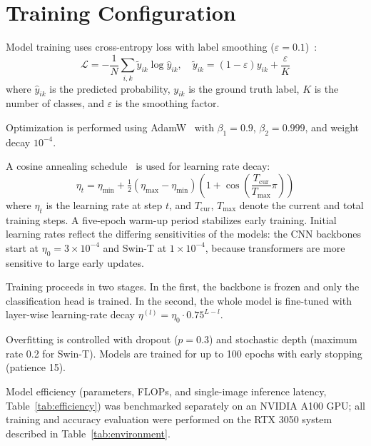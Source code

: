 \documentclass[runningheads]{llncs}
\begin{document}
\section{Training Configuration}
\label{sec:training}

Model training uses cross-entropy loss with label smoothing ($\varepsilon=0.1$)~\cite{szegedy2016rethinking}:
\begin{equation}
    \mathcal{L} =
    -\frac{1}{N}\sum_{i,k}\tilde{y}_{ik}\log \hat{y}_{ik}, \quad
    \tilde{y}_{ik} = (1 - \varepsilon)y_{ik} + \frac{\varepsilon}{K}
    \label{eq:loss}
\end{equation}
where $\hat{y}_{ik}$ is the predicted probability, $y_{ik}$ is the ground truth label, $K$ is the number of classes, and $\varepsilon$ is the smoothing factor.

Optimization is performed using AdamW~\cite{loshchilov2019adamw} with $\beta_1=0.9$, $\beta_2=0.999$, and weight decay $10^{-4}$.

A cosine annealing schedule~\cite{loshchilov2017sgdr} is used for learning rate decay:
\begin{equation}
    \eta_t = \eta_{\min} + \tfrac{1}{2}(\eta_{\max} - \eta_{\min})
    \left(1 + \cos\!\left(\frac{T_{\mathrm{cur}}}{T_{\mathrm{max}}}\pi\right)\right)
    \label{eq:cosine}
\end{equation}
where $\eta_t$ is the learning rate at step $t$, and $T_{\mathrm{cur}}$, $T_{\mathrm{max}}$ denote the current and total training steps. A five-epoch warm-up period stabilizes early training. Initial learning rates reflect the differing sensitivities of the models: the CNN backbones start at $\eta_0=3\times10^{-4}$ and Swin-T at $1\times10^{-4}$, because transformers are more sensitive to large early updates.

Training proceeds in two stages. In the first, the backbone is frozen and only the classification head is trained. In the second, the whole model is fine-tuned with layer-wise learning-rate decay $\eta^{(l)}=\eta_0\cdot0.75^{L-l}$.

Overfitting is controlled with dropout ($p=0.3$) and stochastic depth (maximum rate 0.2 for Swin-T). Models are trained for up to 100 epochs with early stopping (patience 15).

Model efficiency (parameters, FLOPs, and single-image inference latency, Table~\ref{tab:efficiency}) was benchmarked separately on an NVIDIA A100 GPU; all training and accuracy evaluation were performed on the RTX 3050 system described in Table~\ref{tab:environment}.
\end{document}
